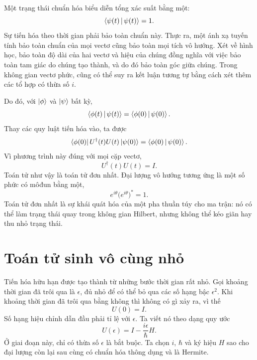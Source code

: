 Một trạng thái chuẩn hóa biểu diễn tổng xác suất bằng một:
\begin{equation}
\left\langle\psi(t)\,\middle|\,\psi(t)\right\rangle=1.
\end{equation}
Sự tiến hóa theo thời gian phải bảo toàn chuẩn này. Thực ra, một ánh xạ tuyến tính bảo toàn chuẩn của mọi vectơ cũng bảo toàn mọi tích vô hướng. Xét về hình học, bảo toàn độ dài của hai vectơ và hiệu của chúng đồng nghĩa với việc bảo toàn tam giác do chúng tạo thành, và do đó bảo toàn góc giữa chúng. Trong không gian vectơ phức, cũng có thể suy ra kết luận tương tự bằng cách xét thêm các tổ hợp có thừa số \(i\).

Do đó, với \(\left\lvert\phi\right\rangle\) và \(\left\lvert\psi\right\rangle\) bất kỳ,
\begin{equation}
\left\langle\phi(t)\,\middle|\,\psi(t)\right\rangle
=
\left\langle\phi(0)\,\middle|\,\psi(0)\right\rangle.
\end{equation}
Thay các quy luật tiến hóa vào, ta được
\begin{equation}
\left\langle\phi(0)\right\rvert U^\dagger(t)U(t)\left\lvert\psi(0)\right\rangle
=
\left\langle\phi(0)\,\middle|\,\psi(0)\right\rangle.
\end{equation}
Vì phương trình này đúng với mọi cặp vectơ,
\begin{equation}
\boxed{U^\dagger(t)U(t)=I}.
\end{equation}
Toán tử như vậy là toán tử đơn nhất. Đại lượng vô hướng tương ứng là một số phức có môđun bằng một,
\begin{equation}
e^{i\theta}\bigl(e^{i\theta}\bigr)^*=1.
\end{equation}
Toán tử đơn nhất là sự khái quát hóa của một pha thuần túy cho ma trận: nó có thể làm trạng thái quay trong không gian Hilbert, nhưng không thể kéo giãn hay thu nhỏ trạng thái.

\section{Toán tử sinh vô cùng nhỏ}

Tiến hóa hữu hạn được tạo thành từ những bước thời gian rất nhỏ. Gọi khoảng thời gian đã trôi qua là \(\epsilon\), đủ nhỏ để có thể bỏ qua các số hạng bậc \(\epsilon^2\). Khi khoảng thời gian đã trôi qua bằng không thì không có gì xảy ra, vì thế
\begin{equation}
U(0)=I.
\end{equation}
Số hạng hiệu chỉnh dẫn đầu phải tỉ lệ với \(\epsilon\). Ta viết nó theo dạng quy ước
\begin{equation}
\boxed{U(\epsilon)=I-\frac{i\epsilon}{\hbar}H}.
\end{equation}
Ở giai đoạn này, chỉ có thừa số \(\epsilon\) là bắt buộc. Ta chọn \(i\), \(\hbar\) và ký hiệu \(H\) sao cho đại lượng còn lại sau cùng có chuẩn hóa thông dụng và là Hermite.

